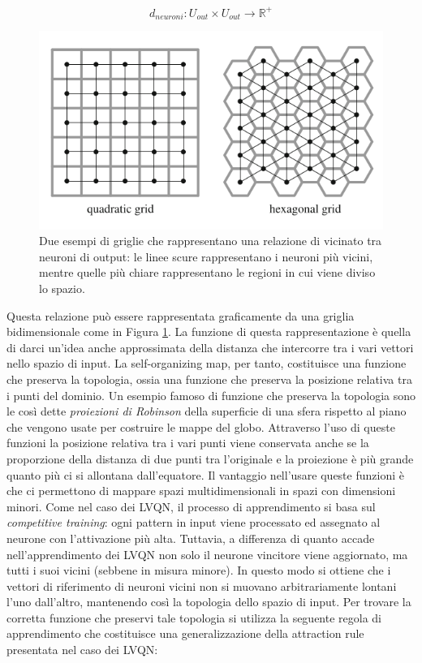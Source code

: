 \documentclass[10pt,a4paper]{article}
\begin{document}
$$
d_{neuroni} : U_{out} \times U_{out} \to \mathbb{R}^+
$$

\begin{figure}
\centering
\includegraphics[scale=0.4]{img/grid.png}
\caption{Due esempi di griglie che rappresentano una relazione di vicinato tra neuroni di output: le linee scure rappresentano i neuroni più vicini, mentre quelle più chiare rappresentano le regioni in cui viene diviso lo spazio.}
\label{fig:21}
\end{figure}


Questa relazione può essere rappresentata graficamente da una griglia bidimensionale come in Figura  \ref{fig:21}. La funzione di questa rappresentazione è quella di darci un'idea anche approssimata della distanza che intercorre tra i vari vettori nello spazio di input. La self-organizing map, per tanto, costituisce una funzione che preserva la topologia, ossia una funzione che preserva la posizione relativa tra i punti del dominio. Un esempio famoso di funzione che preserva la topologia sono le così dette \emph{proiezioni di Robinson} della superficie di una sfera rispetto al piano che vengono usate per costruire le mappe del globo. Attraverso l'uso di queste funzioni la posizione relativa tra i vari punti viene conservata anche se la proporzione della distanza di due punti tra l'originale e la proiezione è più grande quanto più ci si allontana dall'equatore. Il vantaggio nell'usare queste funzioni è che ci permettono di mappare spazi multidimensionali in spazi con dimensioni minori. Come nel caso dei LVQN, il processo di apprendimento si basa sul \emph{competitive training}: ogni pattern in input viene processato ed assegnato al neurone con l'attivazione più alta. Tuttavia, a differenza di quanto accade nell'apprendimento dei LVQN non solo il neurone vincitore viene aggiornato, ma tutti i suoi vicini (sebbene in misura minore). In questo modo si ottiene che i vettori di riferimento di neuroni vicini non si muovano arbitrariamente lontani l'uno dall'altro, mantenendo così la topologia dello spazio di input. Per trovare la corretta funzione che preservi tale topologia si utilizza la seguente regola di apprendimento che costituisce una generalizzazione della attraction rule presentata nel caso dei LVQN:
\end{document}
